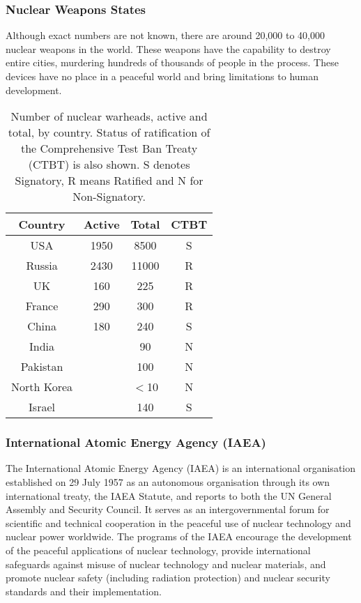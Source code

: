\documentclass[twoside,titlepage,11pt,twocolumn,a4paper]{article}
\begin{document}
\subsubsection{Nuclear Weapons States}
Although exact numbers are not known, there are around 20,000 to
40,000 nuclear weapons in the world. \citep{worldNuclearForces2011, norris2010} These weapons have the
capability to destroy entire cities, murdering hundreds of thousands
of people in the process. These devices have no place in a peaceful
world and bring limitations to human development.

\begin{table}
  \begin{tabular}{|c|c|c|c|}
    \hline
    Country	& Active& Total		& CTBT	\\
    \hline
    USA		& 1950 	& 8500		& S	\\
    Russia	& 2430 	& 11000		& R	\\
    UK		& 160 	& 225		& R	\\
    France	& 290	& 300		& R	\\
    China	& 180	& 240		& S	\\
    India	&	& 90		& N	\\
    Pakistan	&	& 100		& N	\\
    North Korea	&	& \(<\)10	& N	\\
    Israel	&	& 140		& S	\\
    \hline
  \end{tabular}
  \caption{Number of nuclear warheads, active and total, by
    country. Status of ratification of the Comprehensive Test Ban
    Treaty (CTBT) is also shown. S denotes Signatory, R means Ratified
    and N for Non-Signatory.}
  \label{tab:NWSwarheadsCTBT}
\end{table}

\subsubsection{International Atomic Energy Agency (IAEA)}
The International Atomic Energy Agency (IAEA) is an international
organisation established on 29 July 1957 as an autonomous organisation
through its own international treaty, the IAEA Statute, and reports to
both the UN General Assembly and Security Council. It serves as an
intergovernmental forum for scientific and technical cooperation in
the peaceful use of nuclear technology and nuclear power
worldwide. The programs of the IAEA encourage the development of the
peaceful applications of nuclear technology, provide international
safeguards against misuse of nuclear technology and nuclear materials,
and promote nuclear safety (including radiation protection) and
nuclear security standards and their implementation.  
\end{document}
